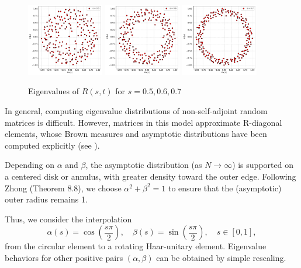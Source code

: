 \documentclass{article}
\begin{document}
	\begin{figure}[htbp]
		\centering
		\includegraphics[width=0.3\textwidth]{figures/intro_circle_s05.pdf}	
		\includegraphics[width=0.3\textwidth]{figures/intro_circle_s06.pdf}
		\includegraphics[width=0.3\textwidth]{figures/intro_circle_s07.pdf}
		\caption{Eigenvalues of $R(s,t)$ for $s = 0.5, 0.6, 0.7$}
		\label{fig:annulus}
	\end{figure}

	In general, computing eigenvalue distributions of non-self-adjoint random matrices is difficult.  
	However, matrices in this model approximate R-diagonal elements,  
	whose Brown measures and asymptotic distributions have been computed explicitly  
	(see \cite{Haagerup-Larsen-2010}).

	Depending on $\alpha$ and $\beta$, the asymptotic distribution (as $N \to \infty$)  
	is supported on a centered disk or annulus,  
	with greater density toward the outer edge.  
	Following Zhong \cite{Zhong-2022} (Theorem 8.8),  
	we choose $\alpha^2 + \beta^2 = 1$ to ensure that the (asymptotic) outer radius remains 1.
	
	Thus, we consider the interpolation
	\[
	\alpha(s) = \cos\left( \frac{s\pi}{2} \right), \quad \beta(s) = \sin\left( \frac{s\pi}{2} \right), \quad s \in [0,1],
	\]
	from the circular element to a rotating Haar-unitary element.  
	Eigenvalue behaviors for other positive pairs $(\alpha, \beta)$  
	can be obtained by simple rescaling.	
\end{document}
